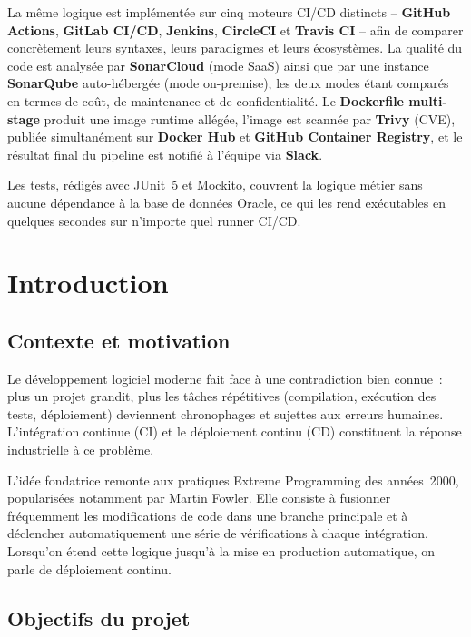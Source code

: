 \documentclass[12pt,a4paper]{report}
\begin{document}
La même logique est implémentée sur cinq moteurs CI/CD distincts -- \textbf{GitHub Actions},
\textbf{GitLab CI/CD}, \textbf{Jenkins}, \textbf{CircleCI} et \textbf{Travis CI} --
afin de comparer concrètement leurs syntaxes, leurs paradigmes et leurs
écosystèmes. La qualité du code est analysée par \textbf{SonarCloud} (mode SaaS)
ainsi que par une instance \textbf{SonarQube} auto-hébergée (mode on-premise),
les deux modes étant comparés en termes de coût, de maintenance et de
confidentialité. Le \textbf{Dockerfile multi-stage} produit une image runtime
allégée, l'image est scannée par \textbf{Trivy} (CVE), publiée simultanément
sur \textbf{Docker Hub} et \textbf{GitHub Container Registry}, et le résultat
final du pipeline est notifié à l'équipe via \textbf{Slack}.

Les tests, rédigés avec JUnit~5 et Mockito, couvrent la logique métier sans
aucune dépendance à la base de données Oracle, ce qui les rend exécutables en
quelques secondes sur n'importe quel runner CI/CD.

\tableofcontents
\listoffigures
\listoftables

\chapter{Introduction}

\section{Contexte et motivation}

Le développement logiciel moderne fait face à une contradiction bien connue~:
plus un projet grandit, plus les tâches répétitives (compilation, exécution des
tests, déploiement) deviennent chronophages et sujettes aux erreurs humaines.
L'intégration continue (CI) et le déploiement continu (CD) constituent la
réponse industrielle à ce problème.

L'idée fondatrice remonte aux pratiques Extreme Programming des années~2000,
popularisées notamment par Martin Fowler. Elle consiste à fusionner
fréquemment les modifications de code dans une branche principale et à
déclencher automatiquement une série de vérifications à chaque intégration.
Lorsqu'on étend cette logique jusqu'à la mise en production automatique, on
parle de déploiement continu.

\section{Objectifs du projet}
\end{document}
